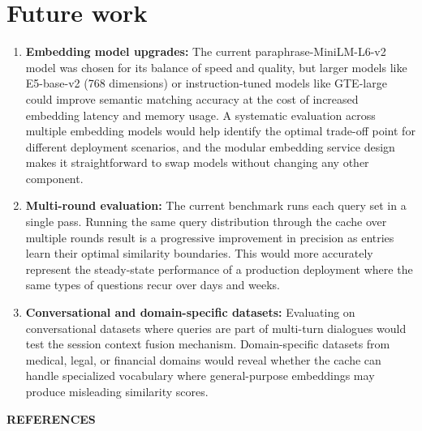 \documentclass[12pt,a4paper]{report}
\begin{document}
\section{Future work}
\begin{enumerate}[label=(\roman*),leftmargin=2cm]
\item \textbf{Embedding model upgrades:} The current paraphrase-MiniLM-L6-v2 model was chosen for its balance of speed and quality, but larger models like E5-base-v2 (768 dimensions) or instruction-tuned models like GTE-large could improve semantic matching accuracy at the cost of increased embedding latency and memory usage. A systematic evaluation across multiple embedding models would help identify the optimal trade-off point for different deployment scenarios, and the modular embedding service design makes it straightforward to swap models without changing any other component.

\item \textbf{Multi-round evaluation:} The current benchmark runs each query set in a single pass. Running the same query distribution through the cache over multiple rounds result is a progressive improvement in precision as entries learn their optimal similarity boundaries. This would more accurately represent the steady-state performance of a production deployment where the same types of questions recur over days and weeks.

\item \textbf{Conversational and domain-specific datasets:} Evaluating on conversational datasets where queries are part of multi-turn dialogues would test the session context fusion mechanism. Domain-specific datasets from medical, legal, or financial domains would reveal whether the cache can handle specialized vocabulary where general-purpose embeddings may produce misleading similarity scores.

\end{enumerate}

\newpage
{}
\begin{center}
{\fontsize{16}{19}\selectfont\bfseries REFERENCES}
\end{center}
\vspace{0.5cm}
\end{document}
